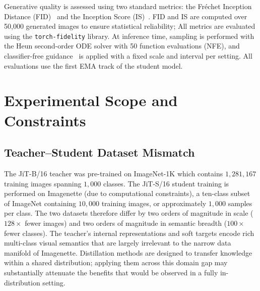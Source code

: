 Generative quality is assessed using two standard metrics: the
Fréchet Inception Distance (FID)~\cite{heusel2017gans} and the Inception Score
(IS)~\cite{salimans2016improved}. FID and IS are computed over 50{,}000
generated images to ensure statistical reliability;
All metrics are evaluated using the \texttt{torch-fidelity} library. At
inference time, sampling is performed with the Heun second-order ODE solver
with 50 function evaluations (NFE), and classifier-free
guidance~\cite{ho2022classifier} is applied with a fixed scale and interval
per setting. All evaluations use the first EMA track of the student model.





























\section{Experimental Scope and Constraints}
\label{sec:constraints}
 
\subsection*{Teacher--Student Dataset Mismatch}
\label{subsec:dataset_mismatch}
 
The JiT-B/16 teacher was pre-trained on ImageNet-1K which contains $1{,}281{,}167$ training images spanning $1{,}000$
classes. The JiT-S/16 student training is performed on Imagenette (due to computational constraints), a ten-class subset of ImageNet containing $10{,}000$ training images, or approximately $1{,}000$ samples per class. The two datasets therefore differ by two orders of magnitude in scale ($128\times$ fewer images) and two orders of magnitude in semantic breadth ($100\times$ fewer classes). The teacher's internal representations and soft targets encode rich multi-class visual semantics that are largely irrelevant to the narrow data manifold of Imagenette. Distillation methods are designed to transfer knowledge within a shared distribution; applying them across this domain gap may substantially attenuate the benefits that would be observed in a fully in-distribution setting.

